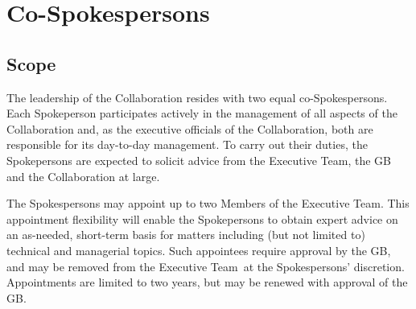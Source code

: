 \documentclass[12pt]{article}
\newcommand{\exec}{{Executive Team}}
\begin{document}


\section{Co-Spokespersons}
\label{sec:spokes}



\subsection{Scope}

The	%
leadership of the Collaboration resides with two equal co-Spokespersons.			
Each Spokeperson participates actively in the management of all aspects of the Collaboration and, as the executive officials of the Collaboration, both  are responsible for its day-to-day management. 
To carry out their duties, the Spokepersons are expected to solicit advice from the \exec, the GB and the Collaboration at large.  %

The Spokespersons may appoint up to two Members of the \exec. This appointment flexibility will enable the Spokepersons to obtain expert advice on an as-needed, short-term basis for matters including (but not limited to) technical and managerial topics.
Such appointees require approval by the GB, 
and may be removed from the \exec\ at the Spokespersons' discretion.  Appointments are limited to two years, but may be renewed with approval of the GB. 
\end{document}
